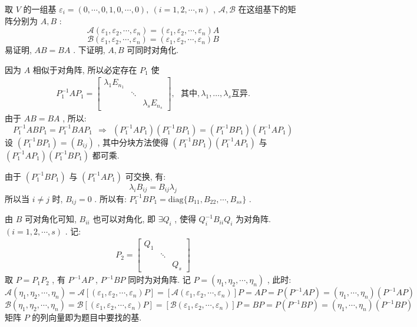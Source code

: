 \documentclass[11pt,a4paper,openany,oneside]{book}
\def\diag{\mathrm{diag}}
\begin{document}
取 $ V $ 的一组基 $ \varepsilon_i = (0, \cdots, 0, 1, 0, \cdots, 0), \ (i=1, 2, \cdots, n) $ ,  $ \mathcal{A}, \mathcal{B} $ 在这组基下的矩阵分别为 $ A, B $ :
 $$  \mathcal{A}(\varepsilon_1, \varepsilon_2, \cdots, \varepsilon_n) = (\varepsilon_1, \varepsilon_2, \cdots, \varepsilon_n)A  $$ 
 $$  \mathcal{B}(\varepsilon_1, \varepsilon_2, \cdots, \varepsilon_n) = (\varepsilon_1, \varepsilon_2, \cdots, \varepsilon_n)B  $$ 
易证明,  $ AB = BA $ . 下证明,  $ A, B $ 可同时对角化.

因为 $ A $ 相似于对角阵, 所以必定存在 $ P_1 $ 使
\begin{gather*}
P_1^{-1}AP_1 = 
\begin{bmatrix}
\lambda_1E_{n_1}  &         &          \\
&  \ddots &          \\
&         &  \lambda_sE_{n_s}
\end{bmatrix}, \ \ \ \text{其中}, \lambda_1, \dots, \lambda_s \text{互异}.
\end{gather*}
由于 $ AB = BA $ , 所以:
 $$  P_1^{-1}ABP_1 = P_1^{-1}BAP_1 \ \ \Rightarrow \ \ (P_1^{-1}AP_1)(P_1^{-1}BP_1) = (P_1^{-1}BP_1)(P_1^{-1}AP_1)   $$ 
设 $ (P_1^{-1}BP_1) = (B_{ij}) $ , 其中分块方法使得 $ (P_1^{-1}BP_1)(P_1^{-1}AP_1) $ 与 $ (P_1^{-1}AP_1)(P_1^{-1}BP_1) $ 都可乘.

由于 $ (P_1^{-1}BP_1) $ 与 $ (P_1^{-1}AP_1) $ 可交换, 有:
 $$  \lambda_iB_{ij} = B_{ij}\lambda_j  $$ 
所以当 $ i \neq j $ 时,  $ B_{ij} = 0 $ . 所以有:  $ P_1^{-1}BP_1 = \diag\{ B_{11}, B_{22}, \cdots, B_{ss} \} $ .

由 $ B $ 可对角化可知,  $ B_{ii} $ 也可以对角化, 即 $ \exists Q_i $ , 使得 $ Q_i^{-1}B_{ii}Q_i $ 为对角阵. $ (i=1, 2, \cdots, s) $ . 记:
\begin{gather*}
P_2 = 
\begin{bmatrix}
Q_1  &      &       \\
&  \ddots  &    \\
&              & Q_s 
\end{bmatrix}
\end{gather*}
取 $ P = P_1P_2 $ , 有 $ P^{-1}AP $ ,  $ P^{-1}BP $ 同时为对角阵. 记 $ P=(\eta_1, \eta_2, \cdots, \eta_n) $ , 此时:
 $$  \mathcal{A}(\eta_1, \eta_2, \cdots, \eta_n) = \mathcal{A}[(\varepsilon_1, \varepsilon_2, \cdots, \varepsilon_n)P] = [\mathcal{A}(\varepsilon_1, \varepsilon_2, \cdots, \varepsilon_n)]P = AP = P(P^{-1}AP)=(\eta_1, \cdots, \eta_n)(P^{-1}AP)  $$ 
 $$  \mathcal{B}(\eta_1, \eta_2, \cdots, \eta_n) = \mathcal{B}[(\varepsilon_1, \varepsilon_2, \cdots, \varepsilon_n)P] = [\mathcal{B}(\varepsilon_1, \varepsilon_2, \cdots, \varepsilon_n)]P = BP =P(P^{-1}BP)= (\eta_1, \cdots, \eta_n)(P^{-1}BP)  $$ 
矩阵 $ P $ 的列向量即为题目中要找的基.
\end{document}
